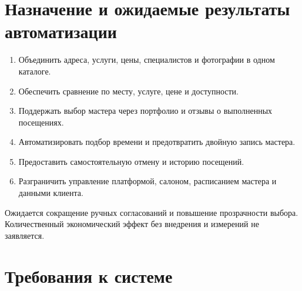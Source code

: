 \section{Назначение и ожидаемые результаты автоматизации}
\begin{enumerate}
\item Объединить адреса, услуги, цены, специалистов и фотографии в одном каталоге.
\item Обеспечить сравнение по месту, услуге, цене и доступности.
\item Поддержать выбор мастера через портфолио и отзывы о выполненных посещениях.
\item Автоматизировать подбор времени и предотвратить двойную запись мастера.
\item Предоставить самостоятельную отмену и историю посещений.
\item Разграничить управление платформой, салоном, расписанием мастера и данными клиента.
\end{enumerate}
Ожидается сокращение ручных согласований и повышение прозрачности выбора. Количественный экономический эффект без внедрения и измерений не заявляется.


\section{Требования к системе}
